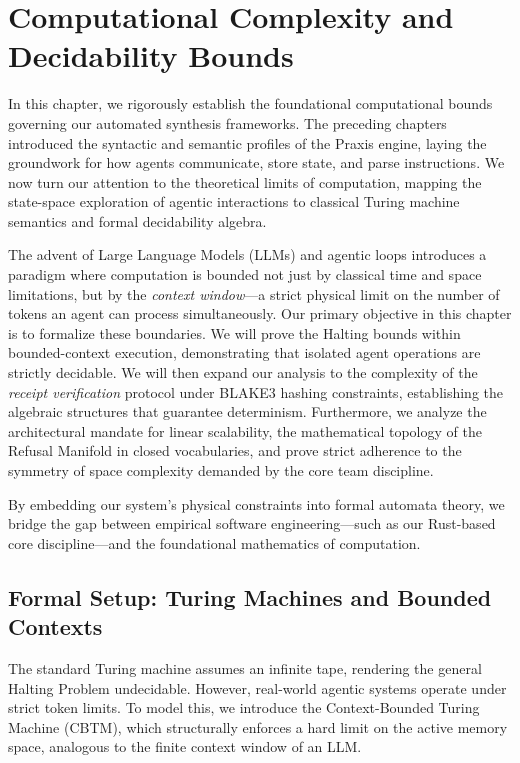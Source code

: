 \chapter{Computational Complexity and Decidability Bounds}
\label{ch:computational_complexity}

In this chapter, we rigorously establish the foundational computational bounds governing our automated synthesis frameworks. The preceding chapters introduced the syntactic and semantic profiles of the Praxis engine, laying the groundwork for how agents communicate, store state, and parse instructions. We now turn our attention to the theoretical limits of computation, mapping the state-space exploration of agentic interactions to classical Turing machine semantics and formal decidability algebra. 

The advent of Large Language Models (LLMs) and agentic loops introduces a paradigm where computation is bounded not just by classical time and space limitations, but by the \textit{context window}—a strict physical limit on the number of tokens an agent can process simultaneously. Our primary objective in this chapter is to formalize these boundaries. We will prove the Halting bounds within bounded-context execution, demonstrating that isolated agent operations are strictly decidable. We will then expand our analysis to the complexity of the \textit{receipt verification} protocol under BLAKE3 hashing constraints, establishing the algebraic structures that guarantee determinism. Furthermore, we analyze the architectural mandate for linear scalability, the mathematical topology of the Refusal Manifold in closed vocabularies, and prove strict adherence to the symmetry of space complexity demanded by the core team discipline.

By embedding our system's physical constraints into formal automata theory, we bridge the gap between empirical software engineering—such as our Rust-based core discipline—and the foundational mathematics of computation.

\section{Formal Setup: Turing Machines and Bounded Contexts}

The standard Turing machine assumes an infinite tape, rendering the general Halting Problem undecidable. However, real-world agentic systems operate under strict token limits. To model this, we introduce the Context-Bounded Turing Machine (CBTM), which structurally enforces a hard limit on the active memory space, analogous to the finite context window of an LLM.

